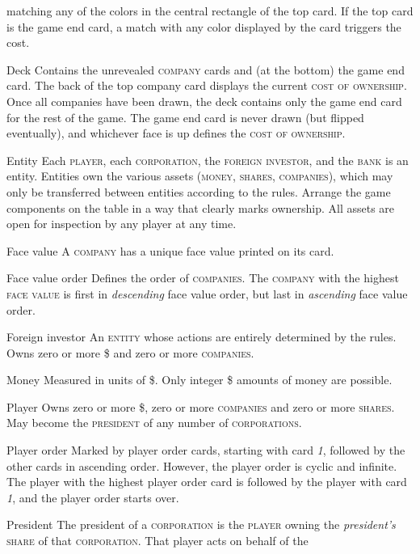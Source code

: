 \documentclass[8pt]{extarticle}
\newenvironment{my_description}
  {\begin{list}{}{\setlength{\labelwidth}{0pt}
   \leftmargin=1.2em
   \setlength{\itemindent}{-\leftmargin}
   \renewcommand{\makelabel}{\descriptionlabel}}
  \setlength{\itemsep}{1pt}
  \setlength{\parskip}{0pt}
  \setlength{\parsep}{0pt}
  }
  {\end{list}}
\begin{document}
\begin{small}
\begin{multicols}{2}
{\begin{my_description}
  matching any of the colors in the central rectangle of the top
  card. If the top card is the game end card, a match with any color
  displayed by the card triggers the cost.
\item[Deck] Contains the unrevealed \textsc{company} cards and (at the
  bottom) the game end card. The back of the top company card displays
  the current \textsc{cost of ownership}. Once all companies have been
  drawn, the deck contains only the game end card for the rest of the
  game. The game end card is never drawn (but flipped eventually), and
  whichever face is up defines the \textsc{cost of ownership}.
\item[Entity] Each \textsc{player}, each \textsc{corporation}, the
  \textsc{foreign investor}, and the \textsc{bank} is an
  entity. Entities own the various assets (\textsc{money},
  \textsc{shares}, \textsc{companies}), which may only
  be transferred between entities according to the rules. Arrange the
  game components on the table in a way that clearly marks ownership.
  All assets are open for inspection by any player at any time.
\item[Face value] A \textsc{company} has a unique face value printed
  on its card.
\item[Face value order] Defines the order of \textsc{companies}.  The
  \textsc{company} with the highest \textsc{face value} is first in
  \emph{descending} face value order, but last in \emph{ascending}
  face value order.
\item[Foreign investor] An \textsc{entity} whose actions are entirely
  determined by the rules. Owns zero or more \$ and zero or more
  \textsc{companies}.
\item[Money] Measured in units of \$. Only integer \$ amounts of money
  are possible.
\item[Player] Owns zero or more \$, zero or more \textsc{companies}
  and zero or more \textsc{shares}. May become the \textsc{president}
  of any number of \textsc{corporations}.
\item[Player order] Marked by player order cards, starting with card
  \emph{1}, followed by the other cards in ascending order. However,
  the player order is cyclic and infinite. The player with the highest
  player order card is followed by the player with card \emph{1}, and
  the player order starts over.
\item[President] The president of a \textsc{corporation} is the
  \textsc{player} owning the \emph{president's} \textsc{share} of that
  \textsc{corporation}. That player acts on behalf of the

\end{my_description}}
\end{multicols}
\end{small}
\end{document}
